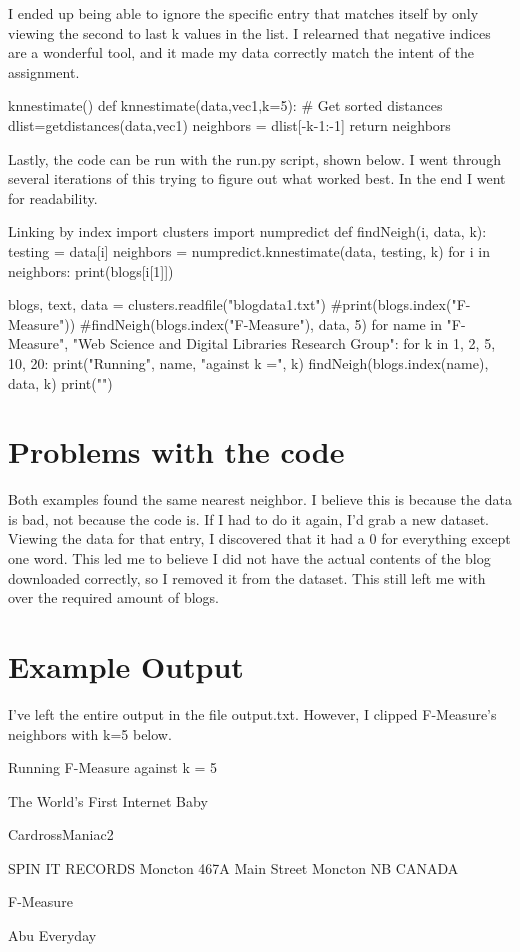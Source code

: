 \documentclass[11pt]{report}
\begin{document}
I ended up being able to ignore the specific entry that matches itself by only viewing the second to last k values in the list. I relearned that negative indices are a wonderful tool, and it made my data correctly match the intent of the assignment.
 
\begin{mylisting}{knnestimate()}
def knnestimate(data,vec1,k=5):
  # Get sorted distances
  dlist=getdistances(data,vec1)
  neighbors = dlist[-k-1:-1]
  return neighbors

\end{mylisting}
	Lastly, the code can be run with the run.py script, shown below. I went through several iterations of this trying to figure out what worked best. In the end I went for readability.
	
	\begin{mylisting}{Linking by index}
import clusters
import numpredict
def findNeigh(i, data, k):
    testing = data[i]
    neighbors = numpredict.knnestimate(data, testing, k)
    for i in neighbors:
        print(blogs[i[1]])


blogs, text, data = clusters.readfile("blogdata1.txt")
#print(blogs.index("F-Measure"))
#findNeigh(blogs.index("F-Measure"), data, 5)
for name in "F-Measure", "Web Science and Digital Libraries Research Group":
    for k in 1, 2, 5, 10, 20:
        print("Running", name, "against k =", k)
        findNeigh(blogs.index(name), data, k)
        print("\n\n")

\end{mylisting}
\section{Problems with the code}

Both examples found the same nearest neighbor. I believe this is because the data is bad, not because the code is. If I had to do it again, I'd grab a new dataset. Viewing the data for that entry, I discovered that it had a 0 for everything except one word. This led me to believe I did not have the actual contents of the blog downloaded correctly, so I removed it from the dataset. This still left me with over the required amount of blogs. 

\section{Example Output}

I've left the entire output in the file output.txt. However, I clipped F-Measure's neighbors with k=5 below.

Running F-Measure against k = 5

The World's First Internet Baby

CardrossManiac2

SPIN IT RECORDS Moncton 467A Main Street Moncton NB CANADA

F-Measure

Abu Everyday
\end{document}
